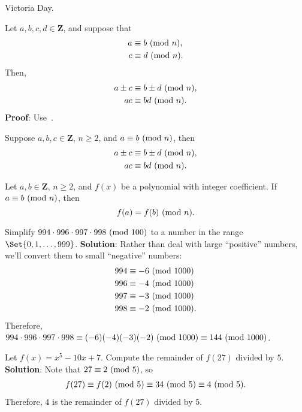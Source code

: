 Victoria Day.
\begin{Proposition}{}{}
    Let $ a,b,c,d\in\mathbf{Z} $, and suppose that
    \begin{align*}
        a & \equiv b\ (\mathrm{mod}\ n), \\
        c & \equiv d\ (\mathrm{mod}\ n).
    \end{align*}
    Then,
    \begin{align*}
        a\pm c & \equiv b\pm d\ (\mathrm{mod}\ n), \\
        ac     & \equiv bd\ (\mathrm{mod}\ n).
    \end{align*}
    \tcblower{}
    \textbf{Proof}: Use~.
\end{Proposition}
\begin{Corollary}{}{}
    Suppose $ a,b,c\in\mathbf{Z} $, $ n\ge 2 $, and $ a\equiv b\ (\mathrm{mod}\ n) $, then
    \begin{align*}
        a\pm c & \equiv b\pm d\ (\mathrm{mod}\ n), \\
        ac     & \equiv bd\ (\mathrm{mod}\ n).
    \end{align*}
\end{Corollary}
\begin{Corollary}{}{}
    Let $ a,b\in\mathbf{Z} $, $ n\ge 2 $, and $ f(x) $ be a polynomial with integer coefficient. If $ a\equiv b\ (\mathrm{mod}\ n) $,
    then
    \[ f(a)=f(b)\ (\mathrm{mod}\ n). \]
\end{Corollary}
\begin{Example}{}{}
    Simplify $ 994\cdot 996\cdot 997\cdot 998 \ (\mathrm{mod}\ 100) $ to a number in the range $ \Set{0,1,\ldots,999} $.
    \tcblower{}
    \textbf{Solution}: Rather than deal with large ``positive'' numbers, we'll convert them to small ``negative'' numbers:
    \begin{align*}
        994 & \equiv -6\ (\mathrm{mod}\ 1000)  \\
        996 & \equiv -4\ (\mathrm{mod}\ 1000)  \\
        997 & \equiv -3\ (\mathrm{mod}\ 1000)  \\
        998 & \equiv -2\ (\mathrm{mod}\ 1000).
    \end{align*}
    Therefore, $ 994\cdot 996\cdot 997\cdot 998\equiv (-6)(-4)(-3)(-2)\ (\mathrm{mod}\ 1000)\equiv 144\ (\mathrm{mod}\ 1000) $.
\end{Example}
\begin{Example}{}{}
    Let $ f(x)=x^5-10x+7 $. Compute the remainder of $ f(27) $ divided by $ 5 $.
    \tcblower{}
    \textbf{Solution}: Note that $ 27\equiv 2\ (\mathrm{mod}\ 5) $, so
    \begin{align*}
        f(27)\equiv f(2)\ (\mathrm{mod}\ 5)\equiv 34\ (\mathrm{mod}\ 5)\equiv 4\ (\mathrm{mod}\ 5).
    \end{align*}
    Therefore, $ 4 $ is the remainder of $ f(27) $ divided by $ 5 $.
\end{Example}
